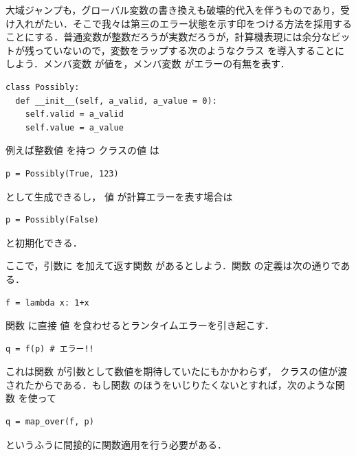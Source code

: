 \documentclass[a5paper,twoside,fleqn,draft]{jsbook}
\begin{document}
大域ジャンプも，グローバル変数の書き換えも破壊的代入を伴うものであり，受け入れがたい．そこで我々は第三のエラー状態を示す印をつける方法を採用することにする．普通変数が整数だろうが実数だろうが，計算機表現には余分なビットが残っていないので，変数をラップする次のようなクラス  を導入することにしよう．メンバ変数  が値を，メンバ変数  がエラーの有無を表す．
\begin{pythoncode}
\begin{verbatim}
class Possibly:
  def __init__(self, a_valid, a_value = 0):
    self.valid = a_valid
    self.value = a_value
\end{verbatim}
\end{pythoncode}

例えば整数値  を持つ  クラスの値  は
\begin{pythoncode}
\begin{verbatim}
p = Possibly(True, 123)
\end{verbatim}
\end{pythoncode}
として生成できるし， 値  が計算エラーを表す場合は
\begin{pythoncode}
\begin{verbatim}
p = Possibly(False)
\end{verbatim}
\end{pythoncode}
と初期化できる．

ここで，引数に  を加えて返す関数  があるとしよう．関数  の定義は次の通りである．
\begin{pythoncode}
\begin{verbatim}
f = lambda x: 1+x
\end{verbatim}
\end{pythoncode}

関数  に直接  値  を食わせるとランタイムエラーを引き起こす．
\begin{pythoncode}
\begin{verbatim}
q = f(p) # エラー!!
\end{verbatim}
\end{pythoncode}
これは関数  が引数として数値を期待していたにもかかわらず， クラスの値が渡されたからである．もし関数  のほうをいじりたくないとすれば，次のような関数  を使って
\begin{pythoncode}
\begin{verbatim}
q = map_over(f, p)
\end{verbatim}
\end{pythoncode}
というふうに間接的に関数適用を行う必要がある．
\end{document}
